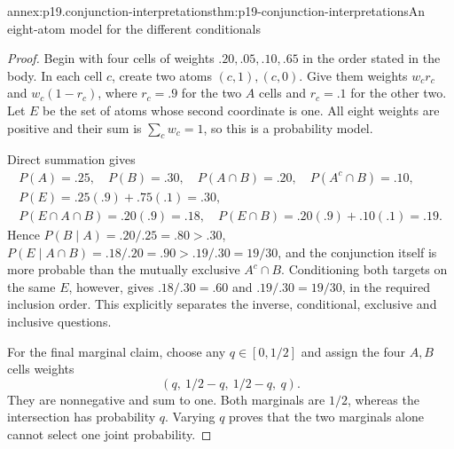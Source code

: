 \begin{annexitem}{annex:p19.conjunction-interpretations}{thm:p19-conjunction-interpretations}{An eight-atom model for the different conditionals}
\begin{proof}
Begin with four cells of weights
\(.20,.05,.10,.65\) in the order stated in the body.
In each cell \(c\), create two atoms \((c,1),(c,0)\).
Give them weights \(w_c r_c\) and \(w_c(1-r_c)\),
where \(r_c=.9\) for the two \(A\) cells and
\(r_c=.1\) for the other two. Let \(E\) be the
set of atoms whose second coordinate is one.
All eight weights are positive and their sum
is \(\sum_cw_c=1\), so this is a probability model.

Direct summation gives
\[
 \begin{gathered}
 P(A)=.25,\quad P(B)=.30,\quad
 P(A\cap B)=.20,\quad P(A^c\cap B)=.10,\\
 P(E)=.25(.9)+.75(.1)=.30,\\
 P(E\cap A\cap B)=.20(.9)=.18,\quad
 P(E\cap B)=.20(.9)+.10(.1)=.19.
 \end{gathered}
\]
Hence \(P(B\mid A)=.20/.25=.80>.30\),
\(P(E\mid A\cap B)=.18/.20=.90>.19/.30=19/30\),
and the conjunction itself is more probable than
the mutually exclusive \(A^c\cap B\).
Conditioning both targets on the same \(E\), however,
gives \(.18/.30=.60\) and \(.19/.30=19/30\),
in the required inclusion order.
This explicitly separates the inverse, conditional,
exclusive and inclusive questions.

For the final marginal claim, choose any
\(q\in[0,1/2]\) and assign the four \(A,B\) cells
weights
\[
                    (q,\ 1/2-q,\ 1/2-q,\ q).
\]
They are nonnegative and sum to one.
Both marginals are \(1/2\), whereas the intersection
has probability \(q\). Varying \(q\) proves that
the two marginals alone cannot select one joint
probability.
\end{proof}
\end{annexitem}

